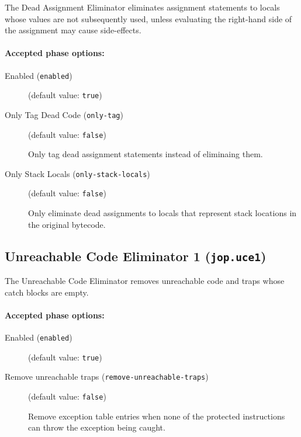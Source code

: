 \documentclass{article}
\begin{document}
The Dead Assignment Eliminator eliminates assignment statements
to locals whose values are not subsequently used, unless
evaluating the right-hand side of the assignment may cause
side-effects.


\paragraph{Accepted phase options:} 

\begin{description}

\item[Enabled ({\tt enabled})]
(default value: {\tt true})






\item[Only Tag Dead Code ({\tt only-tag})]
(default value: {\tt false})




Only tag dead assignment statements instead of eliminaing them.



\item[Only Stack Locals ({\tt only-stack-locals})]
(default value: {\tt false})




Only eliminate dead assignments to locals that represent stack
locations in the original bytecode.



\end{description}

\subsection{Unreachable Code Eliminator 1 ({\tt jop.uce1})}

The Unreachable Code Eliminator removes unreachable code and
traps whose catch blocks are empty.


\paragraph{Accepted phase options:} 

\begin{description}

\item[Enabled ({\tt enabled})]
(default value: {\tt true})






\item[Remove unreachable traps ({\tt remove-unreachable-traps})]
(default value: {\tt false})




Remove exception table entries when none of the protected instructions can
throw the exception being caught.



\end{description}
\end{document}
